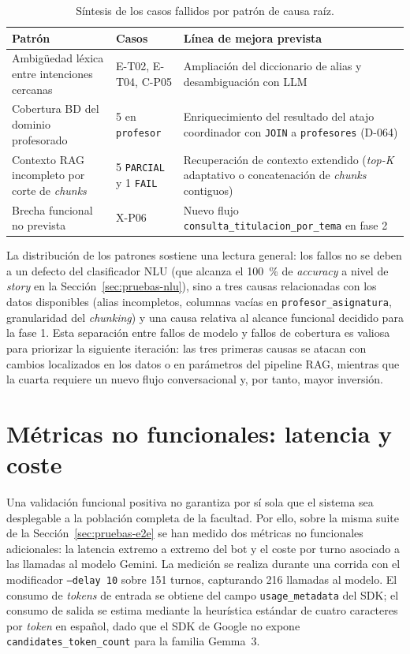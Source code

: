 \begin{table}[hbtp]
\centering
\small
\caption{Síntesis de los casos fallidos por patrón de causa raíz.}\label{tab:casos-fallidos-resumen}
\begin{tabular}{|p{4.4cm}|p{1.6cm}|p{6.5cm}|}
\hline
\textbf{Patrón} & \textbf{Casos} & \textbf{Línea de mejora prevista} \\ \hline
Ambigüedad léxica entre intenciones cercanas & E-T02, E-T04, C-P05 & Ampliación del diccionario de alias y desambiguación con LLM \\ \hline
Cobertura BD del dominio profesorado & 5 en \texttt{profesor} & Enriquecimiento del resultado del atajo coordinador con \texttt{JOIN} a \texttt{profesores} (D-064) \\ \hline
Contexto RAG incompleto por corte de \textit{chunks} & 5 \texttt{PARCIAL} y 1 \texttt{FAIL} & Recuperación de contexto extendido (\textit{top-K} adaptativo o concatenación de \textit{chunks} contiguos) \\ \hline
Brecha funcional no prevista & X-P06 & Nuevo flujo \texttt{consulta\_\allowbreak titulacion\_\allowbreak por\_\allowbreak tema} en fase 2 \\ \hline
\end{tabular}
\end{table}

La distribución de los patrones sostiene una lectura general: los fallos no se deben a un defecto del clasificador NLU (que alcanza el 100~\% de \textit{accuracy} a nivel de \textit{story} en la Sección~\ref{sec:pruebas-nlu}), sino a tres causas relacionadas con los datos disponibles (alias incompletos, columnas vacías en \texttt{profesor\_asignatura}, granularidad del \textit{chunking}) y una causa relativa al alcance funcional decidido para la fase 1. Esta separación entre fallos de modelo y fallos de cobertura es valiosa para priorizar la siguiente iteración: las tres primeras causas se atacan con cambios localizados en los datos o en parámetros del pipeline RAG, mientras que la cuarta requiere un nuevo flujo conversacional y, por tanto, mayor inversión.

\section{Métricas no funcionales: latencia y coste}\label{sec:pruebas-no-funcional}

Una validación funcional positiva no garantiza por sí sola que el sistema sea desplegable a la población completa de la facultad. Por ello, sobre la misma suite de la Sección~\ref{sec:pruebas-e2e} se han medido dos métricas no funcionales adicionales: la latencia extremo a extremo del bot y el coste por turno asociado a las llamadas al modelo Gemini. La medición se realiza durante una corrida con el modificador \texttt{--delay 10} sobre 151 turnos, capturando 216 llamadas al modelo. El consumo de \textit{tokens} de entrada se obtiene del campo \texttt{usage\_metadata} del SDK; el consumo de salida se estima mediante la heurística estándar de cuatro caracteres por \textit{token} en español, dado que el SDK de Google no expone \texttt{candidates\_token\_count} para la familia Gemma~3.

